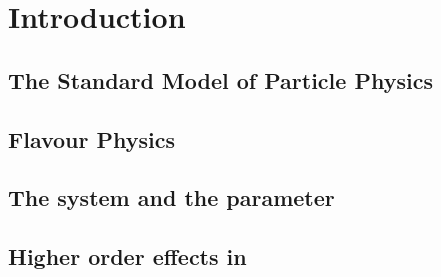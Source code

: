 
\chapter{Introduction}
\label{Introduction}


\section{The Standard Model of Particle Physics}

\section{Flavour Physics}

\section{The \Bs system and the \phis parameter}

\section{Higher order effects in \phis}

